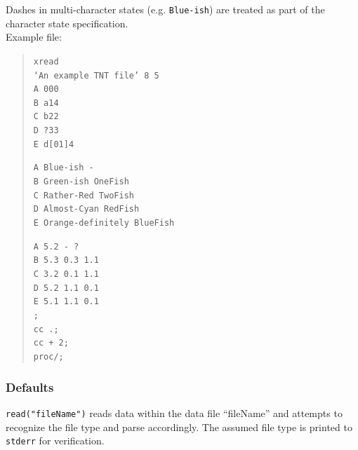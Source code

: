 \begin{description}
		 Dashes in multi-character states (e.g. \texttt{Blue-ish}) are treated as part of the character 
		 state specification.
		 \\
		  
		  Example file:
		  	\begin{quote}
			  	\texttt{xread\\
				  	`An example TNT file' 8 5\\
				  	A 000\\
				  	B a14\\
				  	C b22\\
				  	D ?33\\
				  	E d[01]4\\}
			  	
			  	\texttt{A Blue-ish -\\
				  	B Green-ish OneFish\\
				  	C Rather-Red TwoFish\\
				  	D Almost-Cyan RedFish\\
				  	E Orange-definitely BlueFish\\}
					
				\texttt{A 5.2 - ?\\
					 B 5.3 0.3 1.1\\
					 C 3.2 0.1 1.1\\
					 D 5.2 1.1 0.1\\
					 E 5.1 1.1 0.1\\
				  	;\\
				  	cc .;\\
				  	cc + 2;\\
				  	proc/;\\}
			  \end{quote}
			  
	\end{description}	
		
	\subsubsection{Defaults}
		\texttt{read("fileName")} reads data within the data file ``fileName'' and attempts to 
		recognize the file type and parse accordingly. The assumed file type is printed to 
		\texttt{stderr} for verification.
		
